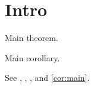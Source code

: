 \section{Intro}
\begin{theorem}\label{thm:main}
Main theorem.
\end{theorem}
\begin{cor}\label{cor:main}
Main corollary.
\end{cor}
See , , , and \vref{cor:main}.
